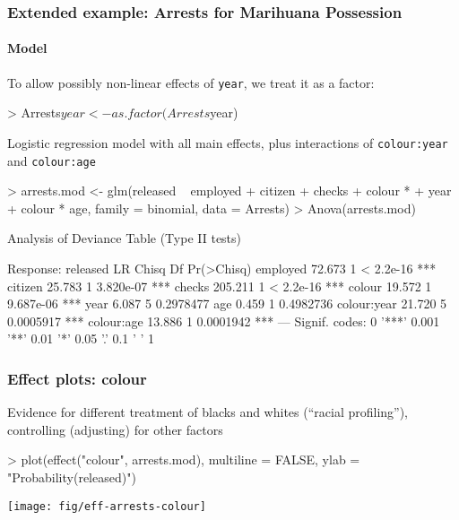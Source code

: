 \begin{frame}[fragile]
	\frametitle{Extended example: Arrests for Marihuana Possession}
	\framesubtitle{Model}

To allow possibly non-linear effects of \texttt{year}, we treat it as a
factor:
\begin{Schunk}
\begin{Sinput}
> Arrests$year <- as.factor(Arrests$year)
\end{Sinput}
\end{Schunk}

Logistic regression model with all main effects, plus interactions of
\texttt{colour:year} and
\texttt{colour:age} 

\begin{Schunk}
\begin{Sinput}
> arrests.mod <- glm(released ~ employed + citizen + checks + colour * 
+     year + colour * age, family = binomial, data = Arrests)
> Anova(arrests.mod)
\end{Sinput}
\begin{Soutput}
Analysis of Deviance Table (Type II tests)

Response: released
            LR Chisq Df Pr(>Chisq)    
employed      72.673  1  < 2.2e-16 ***
citizen       25.783  1  3.820e-07 ***
checks       205.211  1  < 2.2e-16 ***
colour        19.572  1  9.687e-06 ***
year           6.087  5  0.2978477    
age            0.459  1  0.4982736    
colour:year   21.720  5  0.0005917 ***
colour:age    13.886  1  0.0001942 ***
---
Signif. codes:  0 '***' 0.001 '**' 0.01 '*' 0.05 '.' 0.1 ' ' 1 
\end{Soutput}
\end{Schunk}
\end{frame}

\begin{frame}[fragile]
	\frametitle{Effect plots: colour}
	Evidence for different treatment of blacks and whites (``racial profiling''),
	\alert{controlling} (adjusting) for other factors
	

\begin{Schunk}
\begin{Sinput}
> plot(effect("colour", arrests.mod), multiline = FALSE, ylab = "Probability(released)")
\end{Sinput}
\end{Schunk}
\texttt{[image: fig/eff-arrests-colour]}
\end{frame}

